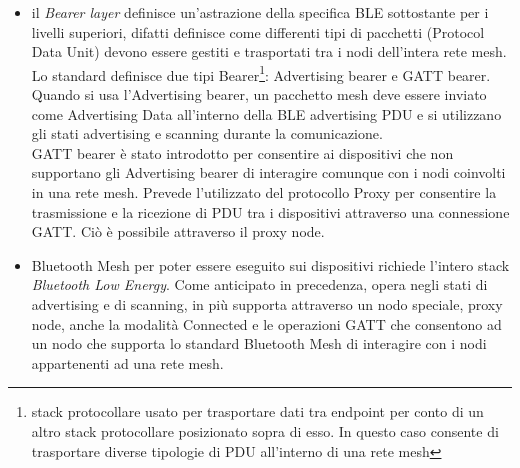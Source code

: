 \begin{itemize}
    \item il \textit{Bearer layer} definisce un'astrazione della specifica BLE sottostante per i livelli superiori, difatti definisce come differenti tipi di pacchetti (Protocol Data Unit) devono essere gestiti e trasportati tra i nodi dell'intera rete mesh. Lo standard definisce due tipi Bearer\footnote{stack protocollare usato per trasportare dati tra endpoint per conto di un altro stack protocollare posizionato sopra di esso. In questo caso consente di trasportare diverse tipologie di PDU all'interno di una rete mesh}: Advertising bearer e GATT bearer. \\
    Quando si usa l'Advertising bearer, un pacchetto mesh deve essere inviato come Advertising Data all'interno della BLE advertising PDU e si utilizzano gli stati advertising e scanning durante la comunicazione.\\
    GATT bearer è stato introdotto per consentire ai dispositivi che non supportano gli Advertising bearer di interagire comunque con i nodi coinvolti in una rete mesh. Prevede l'utilizzato del protocollo Proxy per consentire la trasmissione e la ricezione di PDU tra i dispositivi attraverso una connessione GATT. Ciò è possibile attraverso il proxy node.

    \item Bluetooth Mesh per poter essere eseguito sui dispositivi richiede l'intero stack \textit{Bluetooth Low Energy}. Come anticipato in precedenza, opera negli stati di advertising e di scanning, in più supporta attraverso un nodo speciale, proxy node, anche la modalità Connected e le operazioni GATT che consentono ad un nodo che supporta lo standard Bluetooth Mesh di interagire con i nodi appartenenti ad una rete mesh.
\end{itemize}

